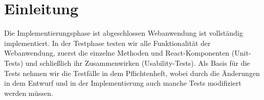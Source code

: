 \section{Einleitung}

Die Implementierungsphase ist abgeschlossen Webanwendung ist vollständig implementiert. In der Testphase testen wir alle Funktionalität der Webanwendung, zuerst die einzelne Methoden und React-Komponenten (Unit-Tests) und schließlich ihr Zusammenwirken (Usability-Tests).
Als Basis für die Tests nehmen wir die Testfälle in dem Pflichtenheft, wobei durch die Änderungen in dem Entwurf und in der Implementierung auch manche Tests modifiziert werden müssen.







